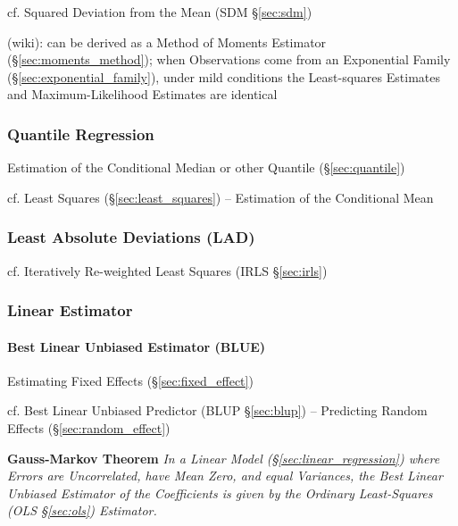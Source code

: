 cf. Squared Deviation from the Mean (SDM \S\ref{sec:sdm})

(wiki): can be derived as a Method of Moments Estimator
(\S\ref{sec:moments_method});
when Observations come from an Exponential Family
(\S\ref{sec:exponential_family}), under mild conditions the Least-squares
Estimates and Maximum-Likelihood Estimates are identical



\subsubsection{Quantile Regression}\label{sec:quantile_regression}

Estimation of the Conditional Median or other Quantile (\S\ref{sec:quantile})

cf. Least Squares (\S\ref{sec:least_squares}) -- Estimation of the Conditional
Mean



\subsubsection{Least Absolute Deviations (LAD)}\label{sec:lad}

cf. Iteratively Re-weighted Least Squares (IRLS \S\ref{sec:irls})



\subsubsection{Linear Estimator}\label{sec:linear_estimator}\hfill




\paragraph{Best Linear Unbiased Estimator (BLUE)}\label{sec:blue}\hfill

Estimating Fixed Effects (\S\ref{sec:fixed_effect})

cf. Best Linear Unbiased Predictor (BLUP \S\ref{sec:blup})
-- Predicting Random Effects (\S\ref{sec:random_effect})

\textbf{Gauss-Markov Theorem} \emph{
  In a Linear Model (\S\ref{sec:linear_regression}) where Errors are
  Uncorrelated, have Mean Zero, and equal Variances, the Best Linear Unbiased
  Estimator of the Coefficients is given by the Ordinary Least-Squares (OLS
  \S\ref{sec:ols}) Estimator.
}

